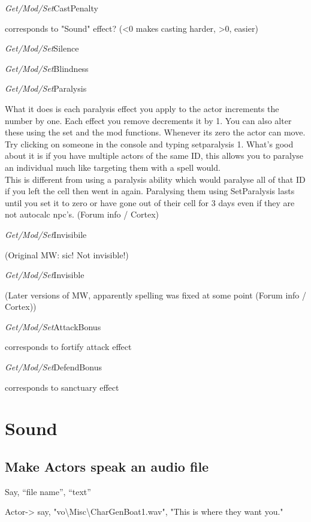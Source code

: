 \emph{Get/Mod/Set}CastPenalty

corresponds to "Sound" effect? (<0 makes casting harder,
>0, easier)

\emph{Get/Mod/Set}Silence

\emph{Get/Mod/Set}Blindness

\emph{Get/Mod/Set}Paralysis

What it does is each paralysis effect you apply to the actor increments
the number by one. Each effect you remove decrements it by 1. You can
also alter these using the set and the mod functions. Whenever its zero
the actor can move. Try clicking on someone in the console and typing
setparalysis 1. What's good about it is if you have multiple actors of
the same ID, this allows you to paralyse an individual much like
targeting them with a spell would.\\
This is different from using a paralysis ability which would paralyse
all of that ID if you left the cell then went in again. Paralysing them
using SetParalysis lasts until you set it to zero or have gone out of
their cell for 3 days even if they are not autocalc npc's. (Forum info /
Cortex)

\emph{Get/Mod/Set}Invisibile

(Original MW: sic! Not invisible!)

\emph{Get/Mod/Set}Invisible

(Later versions of MW, apparently spelling was fixed at some point
(Forum info / Cortex))

\emph{Get/Mod/Set}AttackBonus

corresponds to fortify attack effect

\emph{Get/Mod/Set}DefendBonus

corresponds to sanctuary effect

\hypertarget{sound}{%
\section{\texorpdfstring{\hfill\break
Sound}{ Sound}}\label{sound}}

\hypertarget{make-actors-speak-an-audio-file}{%
\subsection{Make Actors speak an audio
file}\label{make-actors-speak-an-audio-file}}

Say, ``file name'', ``text''

Actor-> say,
"vo\textbackslash Misc\textbackslash CharGenBoat1.wav", "This is where
they want you."

